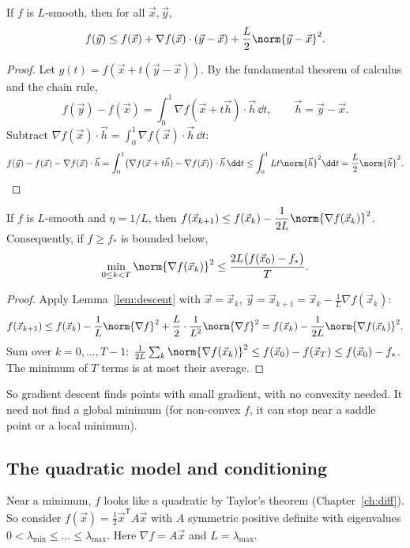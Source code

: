 \begin{lemma}\label{lem:descent}
If $f$ is $L$-smooth, then for all $\vec x,\vec y$,
\[
f(\vec y)\le f(\vec x)+\nabla f(\vec x)\cdot(\vec y-\vec x)+\frac L2\norm{\vec y-\vec x}^2 .
\]
\end{lemma}

\begin{proof}
Let $g(t)=f(\vec x+t(\vec y-\vec x))$. By the fundamental theorem of calculus and the chain rule,
\[
f(\vec y)-f(\vec x)=\int_0^1\nabla f(\vec x+t\vec h)\cdot\vec h\,\dd t,\qquad\vec h=\vec y-\vec x .
\]
Subtract $\nabla f(\vec x)\cdot\vec h=\int_0^1\nabla f(\vec x)\cdot\vec h\,\dd t$:
\[
f(\vec y)-f(\vec x)-\nabla f(\vec x)\cdot\vec h=\int_0^1\bigl(\nabla f(\vec x+t\vec h)-\nabla f(\vec x)\bigr)\cdot\vec h\,\dd t\le\int_0^1Lt\norm{\vec h}^2\dd t=\frac L2\norm{\vec h}^2 .\qedhere
\]
\end{proof}

\begin{theorem}\label{thm:gddecrease}
If $f$ is $L$-smooth and $\eta=1/L$, then $f(\vec x_{k+1})\le f(\vec x_k)-\dfrac1{2L}\norm{\nabla f(\vec x_k)}^2$. Consequently, if $f\ge f_*$ is bounded below,
\[
\min_{0\le k<T}\norm{\nabla f(\vec x_k)}^2\le\frac{2L\bigl(f(\vec x_0)-f_*\bigr)}T .
\]
\end{theorem}

\begin{proof}
Apply Lemma~\ref{lem:descent} with $\vec x=\vec x_k$, $\vec y=\vec x_{k+1}=\vec x_k-\frac1L\nabla f(\vec x_k)$:
\[
f(\vec x_{k+1})\le f(\vec x_k)-\frac1L\norm{\nabla f}^2+\frac L2\cdot\frac1{L^2}\norm{\nabla f}^2=f(\vec x_k)-\frac1{2L}\norm{\nabla f(\vec x_k)}^2 .
\]
Sum over $k=0,\dots,T-1$: $\frac1{2L}\sum_k\norm{\nabla f(\vec x_k)}^2\le f(\vec x_0)-f(\vec x_T)\le f(\vec x_0)-f_*$. The minimum of $T$ terms is at most their average.
\end{proof}

So gradient descent finds points with small gradient, with no convexity needed. It need not find a global minimum (for non-convex $f$, it can stop near a saddle point or a local minimum).

\subsection{The quadratic model and conditioning}

Near a minimum, $f$ looks like a quadratic by Taylor's theorem (Chapter~\ref{ch:diff}). So consider $f(\vec x)=\frac12\vec x^{\mathsf T}A\vec x$ with $A$ symmetric positive definite with eigenvalues $0<\lambda_{\min}\le\dots\le\lambda_{\max}$. Here $\nabla f=A\vec x$ and $L=\lambda_{\max}$.

